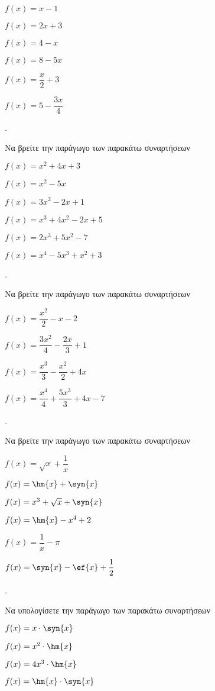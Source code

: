\documentclass[11pt,a4paper,twocolumn]{article}
\newcounter{askhsh}
\newcommand{\askhsh}{\large\theaskhsh.\ \addtocounter{askhsh}{1}}
\begin{document}
\begin{alist}
\begin{multicols}{2}
\item $ f(x)=x-1 $
\item $ f(x)=2x+3 $
\item $ f(x)=4-x $
\item $ f(x)=8-5x $
\item $ f(x)=\dfrac{x}{2}+3 $
\item $ f(x)=5-\dfrac{3x}{4} $
\end{multicols}
\end{alist}
\askhsh Να βρείτε την παράγωγο των παρακάτω συναρτήσεων
\begin{alist}
\item $ f(x)=x^2+4x+3 $
\item $ f(x)=x^2-5x $
\item $ f(x)=3x^2-2x+1 $
\item $ f(x)=x^3+4x^2-2x+5 $
\item $ f(x)=2x^3+5x^2-7 $
\item $ f(x)=x^4-5x^3+x^2+3 $
\end{alist}
\askhsh Να βρείτε την παράγωγο των παρακάτω συναρτήσεων
\begin{alist}
\item $ f(x)=\dfrac{x^2}{2}-x-2 $
\item $ f(x)=\dfrac{3x^2}{4}-\dfrac{2x}{3}+1 $
\item $ f(x)=\dfrac{x^3}{3}-\dfrac{x^2}{2}+4x $
\item $ f(x)=\dfrac{x^4}{4}+\dfrac{5x^3}{3}+4x-7 $
\end{alist}
\askhsh Να βρείτε την παράγωγο των παρακάτω συναρτήσεων
\begin{alist}
\item $ f(x)=\sqrt{x}+\dfrac{1}{x} $
\item $ f(x)=\hm{x}+\syn{x} $
\item $ f(x)=x^3+\sqrt{x}+\syn{x} $
\item $ f(x)=\hm{x}-x^4+2 $
\item $ f(x)=\dfrac{1}{x}-\pi $
\item $ f(x)=\syn{x}-\ef{x}+\dfrac{1}{2} $
\end{alist}
\askhsh Να υπολογίσετε την παράγωγο των παρακάτω συναρτήσεων
\begin{multicols}{2}
\begin{alist}
\item $ f(x)=x\cdot\syn{x} $
\item $ f(x)=x^2\cdot\hm{x} $
\item $ f(x)=4x^3\cdot\hm{x} $
\item $ f(x)=\hm{x}\cdot\syn{x} $
\end{alist}
\end{multicols}
\end{document}

